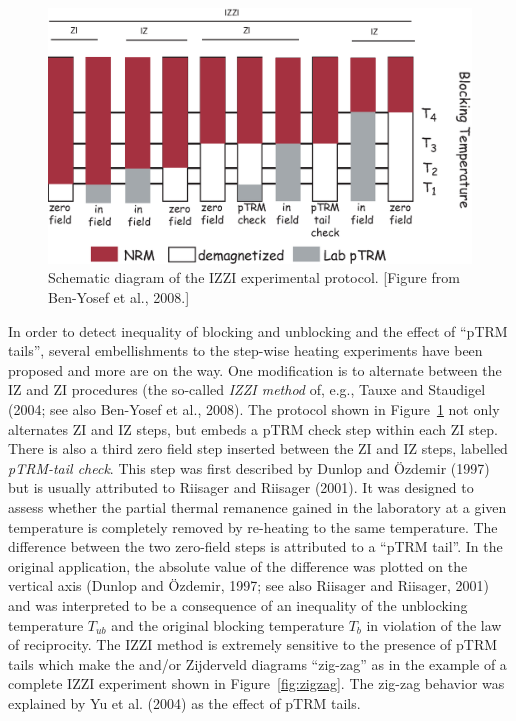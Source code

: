 \begin{figure}[h!tb]
\centering  \includegraphics[width= 14.5 cm]{EPSfiles/method.eps}
\caption{Schematic diagram of the  IZZI experimental protocol.  [Figure from Ben-Yosef et al., 2008.]    }
\label{fig:method}
\end{figure}
  \nocite{benyosef08}


In order to detect inequality of blocking and unblocking and the effect of  ``pTRM tails'',  several embellishments to the step-wise heating experiments have been proposed and more are on the way.  One modification is to alternate between the IZ and ZI procedures (the so-called 
{\it IZZI method}  of, e.g.,  
Tauxe and Staudigel (2004; see also  \nocite{tauxe04} 
Ben-Yosef et al., 2008).   \nocite{benyosef08}  The protocol shown in     Figure~\ref{fig:method} not only alternates ZI and IZ steps, but embeds a pTRM check step within each ZI step.  There is also a third zero field step inserted between the ZI and IZ steps, labelled
{\it pTRM-tail check}.
This step was first described by
\nocite{dunlop97} Dunlop and \"Ozdemir (1997) but is usually attributed to
Riisager and Riisager (2001). \nocite{riisager01}  It was designed to assess whether the  partial thermal remanence gained in the laboratory at a given temperature is completely removed by re-heating to the same temperature.  The difference between the two zero-field steps is attributed to  a ``pTRM tail''.    In the original application, the absolute value of the difference was plotted on the vertical axis 
(Dunlop and \"Ozdemir, 1997; see also Riisager and Riisager, 2001) 
and was interpreted to be   a consequence of an inequality of the unblocking temperature $T_{ub}$ and the original blocking temperature $T_b$ in violation of the 
law of reciprocity.  The IZZI method is extremely sensitive to the presence of  pTRM tails which make the 
and/or Zijderveld  diagrams 	``zig-zag'' as in the  example of a complete IZZI experiment shown in Figure~\ref{fig:zigzag}.    The zig-zag behavior was explained by 
Yu et al. (2004) as the effect of  pTRM tails.  \nocite{yu04}
 
